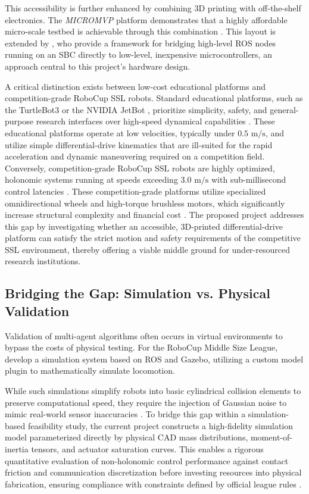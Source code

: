 \documentclass[a4paper,twoside,12pt]{report}
\begin{document}
This accessibility is further enhanced by combining 3D printing with off-the-shelf electronics. The \textit{MICROMVP} platform demonstrates that a highly affordable micro-scale testbed is achievable through this combination \citep{yu2017portable}. This layout is extended by \citet{joseph2018robot}, who provide a framework for bridging high-level ROS nodes running on an SBC directly to low-level, inexpensive microcontrollers, an approach central to this project’s hardware design.

A critical distinction exists between low-cost educational platforms and competition-grade RoboCup SSL robots. Standard educational platforms, such as the TurtleBot3 \citep{turtlebot3_emanual} or the NVIDIA JetBot \citep{jetbot_org}, prioritize simplicity, safety, and general-purpose research interfaces over high-speed dynamical capabilities \citep{joseph2018robot}. These educational platforms operate at low velocities, typically under $0.5\text{ m/s}$, and utilize simple differential-drive kinematics that are ill-suited for the rapid acceleration and dynamic maneuvering required on a competition field. Conversely, competition-grade RoboCup SSL robots are highly optimized, holonomic systems running at speeds exceeding $3.0\text{ m/s}$ with sub-millisecond control latencies \citep{liang2025first}. These competition-grade platforms utilize specialized omnidirectional wheels and high-torque brushless motors, which significantly increase structural complexity and financial cost \citep{ateam2023tdp}. The proposed project addresses this gap by investigating whether an accessible, 3D-printed differential-drive platform can satisfy the strict motion and safety requirements of the competitive SSL environment, thereby offering a viable middle ground for under-resourced research institutions.

\subsection{Bridging the Gap: Simulation vs. Physical Validation}
Validation of multi-agent algorithms often occurs in virtual environments to bypass the costs of physical testing. For the RoboCup Middle Size League, \citet{yao2015simulation} develop a simulation system based on ROS and Gazebo, utilizing a custom model plugin to mathematically simulate locomotion.

While such simulations simplify robots into basic cylindrical collision elements to preserve computational speed, they require the injection of Gaussian noise to mimic real-world sensor inaccuracies \citep{yao2015simulation}. To bridge this gap within a simulation-based feasibility study, the current project constructs a high-fidelity simulation model parameterized directly by physical CAD mass distributions, moment-of-inertia tensors, and actuator saturation curves. This enables a rigorous quantitative evaluation of non-holonomic control performance against contact friction and communication discretization before investing resources into physical fabrication, ensuring compliance with constraints defined by official league rules \citep{ssl_rules_2026}.
\end{document}
